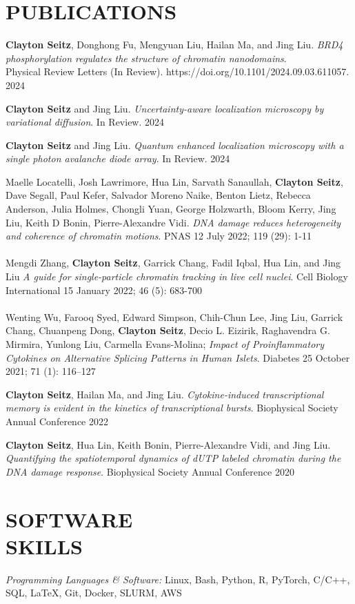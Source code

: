 \documentclass[margin, 10pt]{res} %
\begin{document}
\begin{resume}
\section{PUBLICATIONS}

\textbf{Clayton Seitz}\textsuperscript{\textdagger}, Donghong Fu\textsuperscript{\textdagger}, Mengyuan Liu, Hailan Ma, and Jing Liu. \textit{BRD4 phosphorylation regulates the structure of chromatin nanodomains}.\\ Physical Review Letters (In Review). https://doi.org/10.1101/2024.09.03.611057. 2024

\textbf{Clayton Seitz} and Jing Liu. \textit{Uncertainty-aware localization microscopy by variational diffusion}. In Review. 2024

\textbf{Clayton Seitz} and Jing Liu. \textit{Quantum enhanced localization microscopy with a single photon avalanche diode array}. In Review. 2024

Maelle Locatelli\textsuperscript{\textdagger}, Josh Lawrimore\textsuperscript{\textdagger}, Hua Lin\textsuperscript{\textdagger}, Sarvath Sanaullah, \textbf{Clayton Seitz}, Dave Segall, Paul Kefer, Salvador Moreno Naike, Benton Lietz, Rebecca Anderson, Julia Holmes, Chongli Yuan, George Holzwarth, Bloom Kerry, Jing Liu, Keith D Bonin, Pierre-Alexandre Vidi. \textit{DNA damage reduces heterogeneity and coherence of chromatin motions}. PNAS 12 July 2022; 119 (29): 1-11
\\
\\
Mengdi Zhang, \textbf{Clayton Seitz}, Garrick Chang, Fadil Iqbal, Hua Lin, and Jing Liu \textit{A guide for single-particle chromatin tracking in live cell nuclei}. Cell Biology International 15 January 2022; 46 (5): 683-700
\\
\\
Wenting Wu, Farooq Syed, Edward Simpson, Chih-Chun Lee, Jing Liu, Garrick Chang, Chuanpeng Dong, \textbf{Clayton Seitz}, Decio L. Eizirik, Raghavendra G. Mirmira, Yunlong Liu, Carmella Evans-Molina; \textit{Impact of Proinflammatory Cytokines on Alternative Splicing Patterns in Human Islets}. Diabetes 25 October 2021; 71 (1): 116–127

\textbf{Clayton Seitz}, Hailan Ma, and Jing Liu. \textit{Cytokine-induced transcriptional memory is evident in the kinetics of transcriptional bursts}. Biophysical Society Annual Conference 2022


\textbf{Clayton Seitz}, Hua Lin, Keith Bonin, Pierre-Alexandre Vidi, and Jing Liu. \textit{Quantifying the spatiotemporal dynamics of dUTP labeled chromatin during the DNA damage response}. Biophysical Society Annual Conference 2020


\section{SOFTWARE \\ SKILLS} 

{\sl Programming Languages \& Software:} 
Linux, Bash, Python, R, PyTorch, C/C++, SQL, LaTeX, Git, Docker, SLURM, AWS\\

\end{resume}
\end{document}
